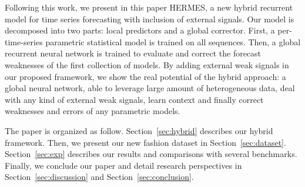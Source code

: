 \documentclass{article} %
\begin{document}
Following this work, we present in this paper HERMES, a new hybrid recurrent model for time series forecasting with inclusion of external signals. Our model is decomposed  into two parts: local predictors and a global corrector.  First, a per-time-series parametric statistical model is trained on all sequences. Then,  a global recurrent neural network is trained to evaluate and correct the forecast weaknesses of the first collection of models. By adding external weak signals in our proposed framework, we show the real potential of the hybrid approach: a global neural network, able to leverage large amount of heterogeneous data, deal with any kind of external weak signals, learn context and finally correct weaknesses and errors of any parametric models.



The paper is organized as follow. Section~\ref{sec:hybrid} describes our hybrid framework. Then, we present our new fashion dataset in Section~\ref{sec:dataset}. Section~\ref{sec:exp} describes our results and comparisons with several benchmarks. Finally, we conclude our paper and detail research perspectives in Section~\ref{sec:discussion} and Section~\ref{sec:conclusion}.
\end{document}
